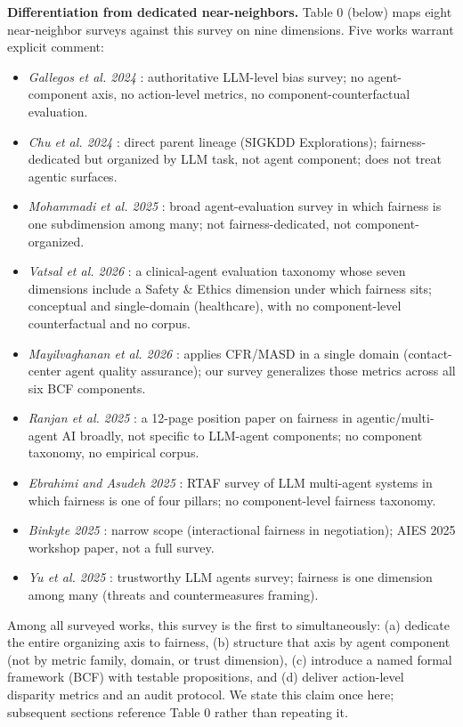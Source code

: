 \documentclass[10pt]{article}
\begin{document}
\textbf{Differentiation from dedicated near-neighbors.} Table 0 (below) maps eight near-neighbor surveys against this survey on nine dimensions. Five works warrant explicit comment:

\begin{itemize}
\item \emph{Gallegos et al. 2024} \cite{gallegos2024bias}: authoritative LLM-level bias survey; no agent-component axis, no action-level metrics, no component-counterfactual evaluation.
\item \emph{Chu et al. 2024} \cite{chu2024fairness}: direct parent lineage (SIGKDD Explorations); fairness-dedicated but organized by LLM task, not agent component; does not treat agentic surfaces.
\item \emph{Mohammadi et al. 2025} \cite{mohammadi2025evaluation}: broad agent-evaluation survey in which fairness is one subdimension among many; not fairness-dedicated, not component-organized.
\item \emph{Vatsal et al. 2026} \cite{vatsal2026agentic}: a clinical-agent evaluation taxonomy whose seven dimensions include a Safety \& Ethics dimension under which fairness sits; conceptual and single-domain (healthcare), with no component-level counterfactual and no corpus.
\item \emph{Mayilvaghanan et al. 2026} \cite{mayilvaghanan2026counterfactual}: applies CFR/MASD in a single domain (contact-center agent quality assurance); our survey generalizes those metrics across all six BCF components.
\item \emph{Ranjan et al. 2025} \cite{ranjan2025fairness}: a 12-page position paper on fairness in agentic/multi-agent AI broadly, not specific to LLM-agent components; no component taxonomy, no empirical corpus.
\item \emph{Ebrahimi and Asudeh 2025} \cite{ebrahimi2025survey}: RTAF survey of LLM multi-agent systems in which fairness is one of four pillars; no component-level fairness taxonomy.
\item \emph{Binkyte 2025} \cite{binkyte2025interactional}: narrow scope (interactional fairness in negotiation); AIES 2025 workshop paper, not a full survey.
\item \emph{Yu et al. 2025} \cite{yu2025survey}: trustworthy LLM agents survey; fairness is one dimension among many (threats and countermeasures framing).
\end{itemize}

Among all surveyed works, this survey is the first to simultaneously: (a) dedicate the entire organizing axis to fairness, (b) structure that axis by agent component (not by metric family, domain, or trust dimension), (c) introduce a named formal framework (BCF) with testable propositions, and (d) deliver action-level disparity metrics and an audit protocol. We state this claim once here; subsequent sections reference Table 0 rather than repeating it.
\end{document}
